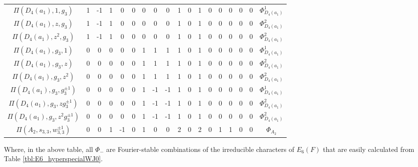 \begin{landscape}
\begin{table}[ht]
{\begin{tabular}{|c|cccccccc|cccc|cccc|c|}
            $\Pi(D_4(a_1),1,g_3)$ & 1 & -1 & 1 & 0 & 0 & 0 & 0 & 0 & 1 & 0 & 1 & 0 & 0 & 0 & 0 & 0 & $\Phi_{D_4(a_1)}^1$ \\
            $\Pi(D_4(a_1),z,g_3)$ & 1 & -1 & 1 & 0 & 0 & 0 & 0 & 0 & 1 & 0 & 1 & 0 & 0 & 0 & 0 & 0 & $\Phi_{D_4(a_1)}^2$ \\
            $\Pi(D_4(a_1),z^2,g_3)$ & 1 & -1 & 1 & 0 & 0 & 0 & 0 & 0 & 1 & 0 & 1 & 0 & 0 & 0 & 0 & 0 & $\Phi_{D_4(a_1)}^2$ \\
            $\Pi(D_4(a_1),g_3,1)$ & 0 & 0 & 0 & 0 & 0 & 1 & 1 & 1 & 1 & 0 & 1 & 0 & 0 & 0 & 0 & 0 & $\Phi_{D_4(a_1)}^1$ \\
            $\Pi(D_4(a_1),g_3,z)$ & 0 & 0 & 0 & 0 & 0 & 1 & 1 & 1 & 1 & 0 & 1 & 0 & 0 & 0 & 0 & 0 & $\Phi_{D_4(a_1)}^2$ \\
            $\Pi(D_4(a_1),g_3,z^2)$ & 0 & 0 & 0 & 0 & 0 & 1 & 1 & 1 & 1 & 0 & 1 & 0 & 0 & 0 & 0 & 0 & $\Phi_{D_4(a_1)}^2$ \\
            $\Pi(D_4(a_1),g_3,g_3^{\pm1})$ & 0 & 0 & 0 & 0 & 0 & 1 & -1 & -1 & 1 & 0 & 1 & 0 & 0 & 0 & 0 & 0 & $\Phi_{D_4(a_1)}^1$ \\
            $\Pi(D_4(a_1),g_3,zg_3^{\pm1})$ & 0 & 0 & 0 & 0 & 0 & 1 & -1 & -1 & 1 & 0 & 1 & 0 & 0 & 0 & 0 & 0 & $\Phi_{D_4(a_1)}^2$ \\
            $\Pi(D_4(a_1),g_3,z^2g_3^{\pm1})$ & 0 & 0 & 0 & 0 & 0 & 1 & -1 & -1 & 1 & 0 & 1 & 0 & 0 & 0 & 0 & 0 & $\Phi_{D_4(a_1)}^2$ \\\hline

            $\Pi(A_2,s_{3,3}, w_{3,3}^{\pm1})$ & 0 & 0 & 1 & -1 & 0 & 1 & 0 & 0 & 2 & 0 & 2 & 0 & 1 & 1 & 0 & 0 & $\Phi_{A_2}$ \\\hline        
        \end{tabular}
        }
    \end{table}

    Where, in the above table, all $\Phi_{-}$ are Fourier-stable combinations of the irreducible characters of $E_6(F)$ that are easily calculated from Table \ref{tbl:E6_hyperspecialWJ0}.

    \newpage

\end{landscape}
    
